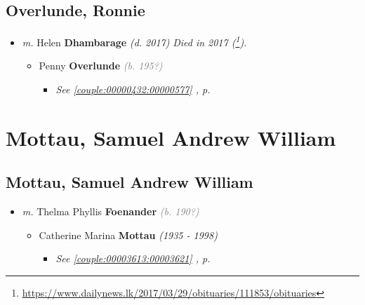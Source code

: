 \documentclass[10pt, openany]{book}
\begin{document}
\chapter{Overlunde, Ronnie}
\label{00002633}
\textcolor{slmaroon}{\textit{}}
\begin{itemize}
\item{\textit{m.} Helen \textbf{Dhambarage} \textcolor{slorange}{\textit{(d. 2017)}} \textcolor{slmaroon}{\textit{Died in 2017 (\footnote{\url{https://www.dailynews.lk/2017/03/29/obituaries/111853/obituaries}}).}}   \label{couple:00002633:00002634} \begin{itemize}
\item{Penny \textbf{Overlunde} \textcolor{gray}{\textit{(b. 195?)}}
\begin{itemize}
\item{\textcolor{slteal}{\textit{See  \autoref{couple:00000432:00000577} \textit{, p. \pageref{couple:00000432:00000577} }}}}
\end{itemize}
 }
\end{itemize}}
\end{itemize}
 
\part{Mottau, Samuel Andrew William}
\chapter{Mottau, Samuel Andrew William}
\label{00003622}
\textcolor{slmaroon}{\textit{}}
\begin{itemize}
\item{\textit{m.} Thelma Phyllis \textbf{Foenander} \textcolor{gray}{\textit{(b. 190?)}}   \label{couple:00003622:00003623} \begin{itemize}
\item{Catherine Marina \textbf{Mottau} \textcolor{slorange}{\textit{(1935 - 1998)}}
\begin{itemize}
\item{\textcolor{slteal}{\textit{See  \autoref{couple:00003613:00003621} \textit{, p. \pageref{couple:00003613:00003621} }}}}
\end{itemize}
  }
\end{itemize}}
\end{itemize}
   
\end{document}
